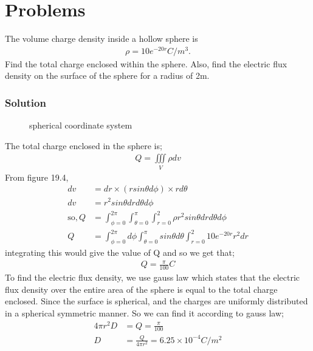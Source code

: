 \section{Problems}
\begin{example}
The volume charge density inside a hollow sphere is 
\begin{align*}
\rho=10e^{-20r} C/m^{3}.
\end{align*}
Find the total charge enclosed within the sphere. Also, find the electric flux density on the surface of the sphere for a radius of 2m.

\subsubsection*{Solution}
\begin{figure}[h]
\centering
\caption{spherical coordinate system}
\end{figure} 

The total charge enclosed in the sphere is;
\begin{align*}
Q=\iiint\limits_V\rho dv
\end{align*}
From figure 19.4, 
\begin{align*}
dv &= dr\times(rsin\theta d\phi)\times rd\theta \\
dv&=r^{2}sin\theta drd\theta d\phi\\
\text{so}, Q&=\int^{2\pi}_{\phi=0}\int^{\pi}_{\theta=0}\int^{2}_{r=0} \rho r^{2}sin\theta drd\theta d\phi\\
Q&= \int^{2\pi}_{\phi=0}d\phi\int^{\pi}_{\theta=0}sin\theta d\theta\int^{2}_{r=0}10e^{-20r}r^{2}dr
\end{align*}
integrating this would give the value of Q and so we get that;
\begin{align*}
Q=\frac{\pi}{100} C
\end{align*}
To find the electric flux density, we use gauss law which states that the electric flux density over the entire area of the sphere is equal to the total charge enclosed. Since the surface is  spherical, and the charges are uniformly distributed in a spherical symmetric manner. So we can find it according to gauss law;
\begin{align*}
4\pi r^{2}D&=Q=\frac{\pi}{100}\\
D&=\frac{Q}{4\pi r^{2}}= 6.25\times10^{-4} C/m^{2}
\end{align*}
\end{example}

